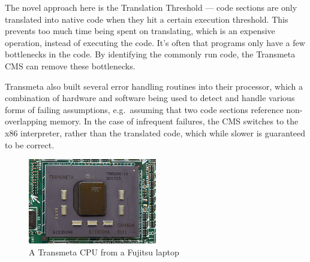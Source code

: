 The novel approach here is the Translation Threshold --- code sections are only
translated into native code when they hit a certain execution threshold. This
prevents too much time being spent on translating, which is an expensive
operation, instead of executing the code. It's often that programs only have a
few bottlenecks in the code. By identifying the commonly run code, the Transmeta
CMS can remove these bottlenecks.

Transmeta also built several error handling routines into their processor, which
a combination of hardware and software being used to detect and handle various
forms of failing assumptions, e.g.\ assuming that two code sections reference
non-overlapping memory. In the case of infrequent failures, the CMS switches to
the x86 interpreter, rather than the translated code, which while slower is
guaranteed to be correct.\cite{TransmetaCodeMorph}

\begin{figure}
  \includegraphics[width=0.5\textwidth]{imgs/Transmeta_TM5600}
  \caption{A Transmeta CPU from a Fujitsu laptop}
\end{figure}

